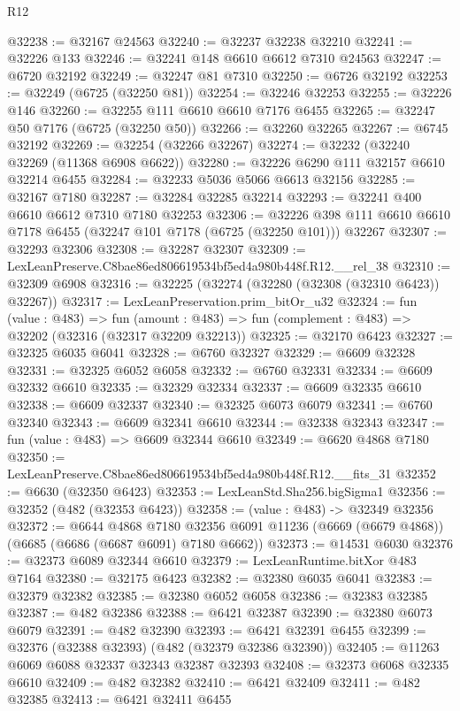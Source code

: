 \begin{lexlean}{R12}
\begin{coremodule}
@32238 := @32167 @24563
@32240 := @32237 @32238 @32210
@32241 := @32226 @133
@32246 := @32241 @148 @6610 @6612 @7310 @24563
@32247 := @6720 @32192
@32249 := @32247 @81 @7310
@32250 := @6726 @32192
@32253 := @32249 (@6725 (@32250 @81))
@32254 := @32246 @32253
@32255 := @32226 @146
@32260 := @32255 @111 @6610 @6610 @7176 @6455
@32265 := @32247 @50 @7176 (@6725 (@32250 @50))
@32266 := @32260 @32265
@32267 := @6745 @32192
@32269 := @32254 (@32266 @32267)
@32274 := @32232 (@32240 @32269 (@11368 @6908 @6622))
@32280 := @32226 @6290 @111 @32157 @6610 @32214 @6455
@32284 := @32233 @5036 @5066 @6613 @32156
@32285 := @32167 @7180
@32287 := @32284 @32285 @32214
@32293 := @32241 @400 @6610 @6612 @7310 @7180 @32253
@32306 := @32226 @398 @111 @6610 @6610 @7178 @6455 (@32247 @101 @7178 (@6725 (@32250 @101))) @32267
@32307 := @32293 @32306
@32308 := @32287 @32307
@32309 := LexLeanPreserve.C8bae86ed806619534bf5ed4a980b448f.R12.__rel_38
@32310 := @32309 @6908
@32316 := @32225 (@32274 (@32280 (@32308 (@32310 @6423)) @32267))
@32317 := LexLeanPreservation.prim_bitOr_u32
@32324 := fun (value : @483) =>
  fun (amount : @483) => fun (complement : @483) => @32202 (@32316 (@32317 @32209 @32213))
@32325 := @32170 @6423
@32327 := @32325 @6035 @6041
@32328 := @6760 @32327
@32329 := @6609 @32328
@32331 := @32325 @6052 @6058
@32332 := @6760 @32331
@32334 := @6609 @32332 @6610
@32335 := @32329 @32334
@32337 := @6609 @32335 @6610
@32338 := @6609 @32337
@32340 := @32325 @6073 @6079
@32341 := @6760 @32340
@32343 := @6609 @32341 @6610
@32344 := @32338 @32343
@32347 := fun (value : @483) => @6609 @32344 @6610
@32349 := @6620 @4868 @7180
@32350 := LexLeanPreserve.C8bae86ed806619534bf5ed4a980b448f.R12.__fits_31
@32352 := @6630 (@32350 @6423)
@32353 := LexLeanStd.Sha256.bigSigma1
@32356 := @32352 (@482 (@32353 @6423))
@32358 := (value : @483) -> @32349 @32356
@32372 := @6644
    @4868
    @7180
    @32356
    @6091
    @11236
    (@6669 (@6679 @4868))
    (@6685 (@6686 (@6687 @6091) @7180 @6662))
@32373 := @14531 @6030
@32376 := @32373 @6089 @32344 @6610
@32379 := LexLeanRuntime.bitXor @483 @7164
@32380 := @32175 @6423
@32382 := @32380 @6035 @6041
@32383 := @32379 @32382
@32385 := @32380 @6052 @6058
@32386 := @32383 @32385
@32387 := @482 @32386
@32388 := @6421 @32387
@32390 := @32380 @6073 @6079
@32391 := @482 @32390
@32393 := @6421 @32391 @6455
@32399 := @32376 (@32388 @32393) (@482 (@32379 @32386 @32390))
@32405 := @11263 @6069 @6088 @32337 @32343 @32387 @32393
@32408 := @32373 @6068 @32335 @6610
@32409 := @482 @32382
@32410 := @6421 @32409
@32411 := @482 @32385
@32413 := @6421 @32411 @6455

\end{coremodule}
\end{lexlean}
